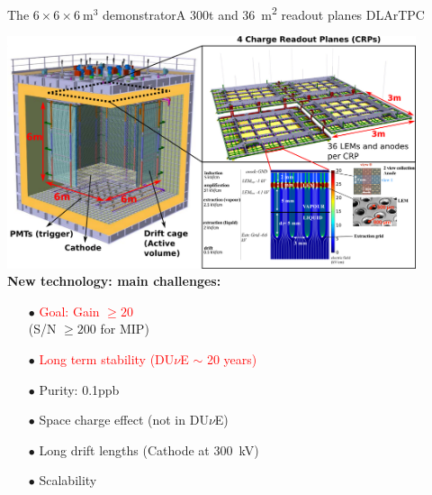 \documentclass[10pt]{beamer}
\begin{document}
    \begin{frame}{The \texorpdfstring{$6 \times 6 \times \SI{6}{\meter\cubed}$}{666}
    		demonstrator}{A 300t and \SI{36}{\meter\squared} readout planes DLArTPC}
    	\begin{scriptsize}
    			\includegraphics[width=0.9\textwidth]{figures/666/666_full.png}\\
    			\vfill
    			\textbf{New technology: main challenges:}\\
    			\begin{minipage}{0.32\textwidth}
    				\begin{itemize}
    					\item[$\bullet$] \textcolor{red}{Goal: Gain $\geq 20$} \\(S/N $\geq 200$ for MIP)
    					\item[$\bullet$] \textcolor{red}{Long term stability (DU$\nu$E $\sim$ 20 years)}
    				\end{itemize}
    			\end{minipage}\hfill
    			\begin{minipage}{0.32\textwidth}
    				\begin{itemize}
    					\item[$\bullet$] Purity: 0.1\;ppb
    					\item[$\bullet$] Space charge effect
    					(not in DU$\nu$E)
    				\end{itemize}
	    		\end{minipage}\hfill
	    		\begin{minipage}{0.32\textwidth}
	    			\begin{itemize}
	    				\item[$\bullet$] Long drift lengths (Cathode at \SI{300}{\kilo\volt})
	    				\item[$\bullet$] Scalability
	    			\end{itemize}
	    		\end{minipage}
    	\end{scriptsize} 
    \end{frame}
    
\end{document}
